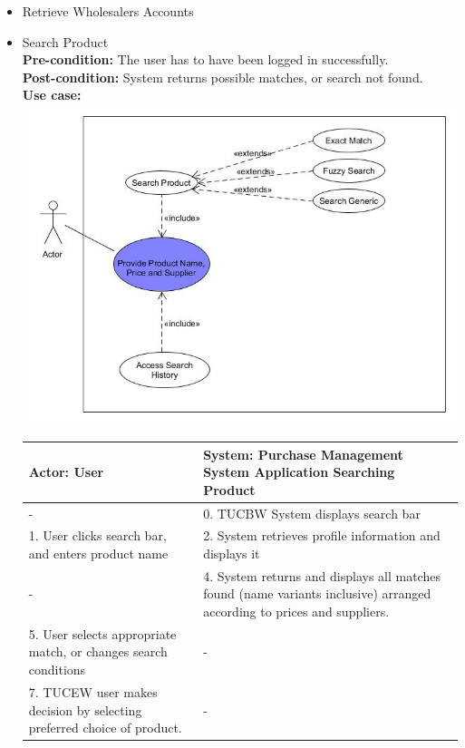 \documentclass[a4paper,10pt]{article}
\begin{document}
\begin{enumerate}
\begin{itemize}
				\item Retrieve Wholesalers Accounts 
				\item Search Product \\
				\textbf{Pre-condition: } The user has to have been logged in successfully.  \\
				\textbf{Post-condition: }  System returns possible matches, or search not found. \\
				\textbf{Use case: }\\
 				\includegraphics[scale=0.5]{Search UC diagram.jpg}
				\begin{center}
				\begin{tabular}{ |p{8cm}|p{8cm}| }
				 \hline
  				\textbf{Actor:} User & \textbf{System: Purchase Management System Application} Searching Product \\
				 \hline
				 - & 0. TUCBW System displays search bar\\
				 \hline
				  1. User clicks search bar, and enters product name & 2. System retrieves profile information and displays it\\
				 \hline
				 - & 4. System returns and displays all matches found (name variants inclusive)  arranged according to prices and suppliers. \\
				 \hline
				5. User selects appropriate match, or changes search conditions & - \\
				 \hline
				7. TUCEW user makes decision by selecting preferred choice of product. & - \\
				\hline
				\end{tabular}
				\end{center}

\end{itemize}
\end{enumerate}
\end{document}

